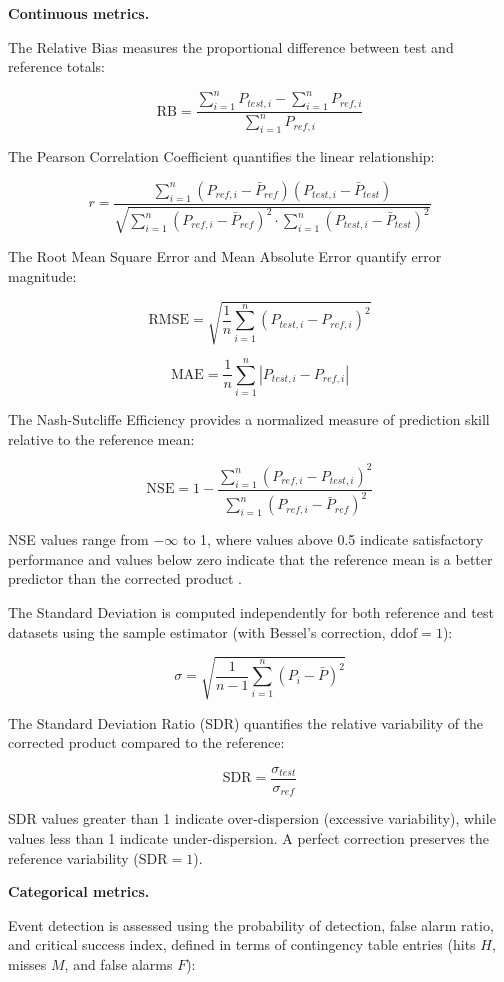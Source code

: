 \documentclass[
]{article}
\begin{document}
\textbf{Continuous metrics.}

The Relative Bias measures the proportional difference between test and
reference totals:

\[\text{RB} = \frac{\sum_{i=1}^{n} P_{test,i} - \sum_{i=1}^{n} P_{ref,i}}{\sum_{i=1}^{n} P_{ref,i}}\]

The Pearson Correlation Coefficient quantifies the linear relationship:

\[r = \frac{\sum_{i=1}^{n}(P_{ref,i} - \bar{P}_{ref})(P_{test,i} - \bar{P}_{test})}{\sqrt{\sum_{i=1}^{n}(P_{ref,i} - \bar{P}_{ref})^2 \cdot \sum_{i=1}^{n}(P_{test,i} - \bar{P}_{test})^2}}\]

The Root Mean Square Error and Mean Absolute Error quantify error
magnitude:

\[\text{RMSE} = \sqrt{\frac{1}{n} \sum_{i=1}^{n} (P_{test,i} - P_{ref,i})^2}\]

\[\text{MAE} = \frac{1}{n} \sum_{i=1}^{n} |P_{test,i} - P_{ref,i}|\]

The Nash-Sutcliffe Efficiency provides a normalized measure of
prediction skill relative to the reference mean:

\[\text{NSE} = 1 - \frac{\sum_{i=1}^{n}(P_{ref,i} - P_{test,i})^2}{\sum_{i=1}^{n}(P_{ref,i} - \bar{P}_{ref})^2}\]

NSE values range from \(-\infty\) to 1, where values above 0.5 indicate
satisfactory performance and values below zero indicate that the
reference mean is a better predictor than the corrected product
\cite{ref28,ref29}.

The Standard Deviation is computed independently for both reference and
test datasets using the sample estimator (with Bessel's correction,
\(\text{ddof} = 1\)):

\[\sigma = \sqrt{\frac{1}{n-1} \sum_{i=1}^{n} (P_i - \bar{P})^2}\]

The Standard Deviation Ratio (SDR) quantifies the relative variability
of the corrected product compared to the reference:

\[\text{SDR} = \frac{\sigma_{test}}{\sigma_{ref}}\]

SDR values greater than 1 indicate over-dispersion (excessive
variability), while values less than 1 indicate under-dispersion. A
perfect correction preserves the reference variability
(\(\text{SDR} = 1\)).

\textbf{Categorical metrics.}

Event detection is assessed using the probability of detection, false
alarm ratio, and critical success index, defined in terms of contingency
table entries (hits \(H\), misses \(M\), and false alarms \(F\)):
\end{document}
